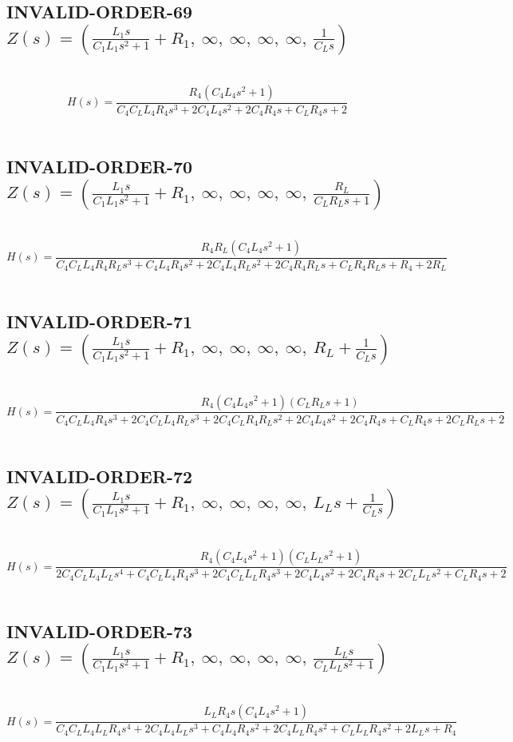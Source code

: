 \documentclass{article}
\begin{document}
\subsection{INVALID-ORDER-69 $Z(s) = \left( \frac{L_{1} s}{C_{1} L_{1} s^{2} + 1} + R_{1}, \  \infty, \  \infty, \  \infty, \  \infty, \  \frac{1}{C_{L} s}\right)$ } \ 
\textbf{\[H(s) = \frac{R_{4} \left(C_{4} L_{4} s^{2} + 1\right)}{C_{4} C_{L} L_{4} R_{4} s^{3} + 2 C_{4} L_{4} s^{2} + 2 C_{4} R_{4} s + C_{L} R_{4} s + 2}\] } \ 
\subsection{INVALID-ORDER-70 $Z(s) = \left( \frac{L_{1} s}{C_{1} L_{1} s^{2} + 1} + R_{1}, \  \infty, \  \infty, \  \infty, \  \infty, \  \frac{R_{L}}{C_{L} R_{L} s + 1}\right)$ } \ 
\textbf{\[H(s) = \frac{R_{4} R_{L} \left(C_{4} L_{4} s^{2} + 1\right)}{C_{4} C_{L} L_{4} R_{4} R_{L} s^{3} + C_{4} L_{4} R_{4} s^{2} + 2 C_{4} L_{4} R_{L} s^{2} + 2 C_{4} R_{4} R_{L} s + C_{L} R_{4} R_{L} s + R_{4} + 2 R_{L}}\] } \ 
\subsection{INVALID-ORDER-71 $Z(s) = \left( \frac{L_{1} s}{C_{1} L_{1} s^{2} + 1} + R_{1}, \  \infty, \  \infty, \  \infty, \  \infty, \  R_{L} + \frac{1}{C_{L} s}\right)$ } \ 
\textbf{\[H(s) = \frac{R_{4} \left(C_{4} L_{4} s^{2} + 1\right) \left(C_{L} R_{L} s + 1\right)}{C_{4} C_{L} L_{4} R_{4} s^{3} + 2 C_{4} C_{L} L_{4} R_{L} s^{3} + 2 C_{4} C_{L} R_{4} R_{L} s^{2} + 2 C_{4} L_{4} s^{2} + 2 C_{4} R_{4} s + C_{L} R_{4} s + 2 C_{L} R_{L} s + 2}\] } \ 
\subsection{INVALID-ORDER-72 $Z(s) = \left( \frac{L_{1} s}{C_{1} L_{1} s^{2} + 1} + R_{1}, \  \infty, \  \infty, \  \infty, \  \infty, \  L_{L} s + \frac{1}{C_{L} s}\right)$ } \ 
\textbf{\[H(s) = \frac{R_{4} \left(C_{4} L_{4} s^{2} + 1\right) \left(C_{L} L_{L} s^{2} + 1\right)}{2 C_{4} C_{L} L_{4} L_{L} s^{4} + C_{4} C_{L} L_{4} R_{4} s^{3} + 2 C_{4} C_{L} L_{L} R_{4} s^{3} + 2 C_{4} L_{4} s^{2} + 2 C_{4} R_{4} s + 2 C_{L} L_{L} s^{2} + C_{L} R_{4} s + 2}\] } \ 
\subsection{INVALID-ORDER-73 $Z(s) = \left( \frac{L_{1} s}{C_{1} L_{1} s^{2} + 1} + R_{1}, \  \infty, \  \infty, \  \infty, \  \infty, \  \frac{L_{L} s}{C_{L} L_{L} s^{2} + 1}\right)$ } \ 
\textbf{\[H(s) = \frac{L_{L} R_{4} s \left(C_{4} L_{4} s^{2} + 1\right)}{C_{4} C_{L} L_{4} L_{L} R_{4} s^{4} + 2 C_{4} L_{4} L_{L} s^{3} + C_{4} L_{4} R_{4} s^{2} + 2 C_{4} L_{L} R_{4} s^{2} + C_{L} L_{L} R_{4} s^{2} + 2 L_{L} s + R_{4}}\] } \ 
\end{document}
